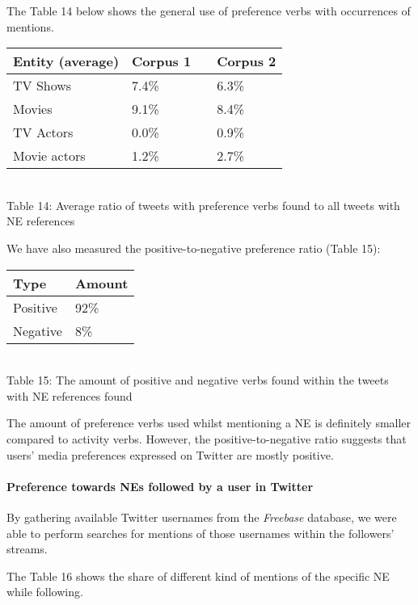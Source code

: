 The Table 14 below shows the general use of preference verbs with occurrences of
mentions.

\begin{center}
  \begin{tabular}{ | p{4cm} | p{2cm} | p{1cm}| p{2cm} | } \hline
    Entity (average) & Corpus 1 & & Corpus 2 \\ \hline
    TV Shows & 7.4\% & & 6.3\% \\ \hline
    Movies & 9.1\% & & 8.4\% \\ \hline
    TV Actors & 0.0\% & & 0.9\% \\ \hline
    Movie actors & 1.2\% & & 2.7\% \\ \hline
  \end{tabular} \\
  Table 14: Average ratio of tweets with preference verbs found to all tweets with NE references \\
\end{center}

We have also measured the positive-to-negative preference ratio (Table 15):

\begin{center}
  \begin{tabular}{ | p{3cm}| p{2cm} | } \hline
    Type & Amount \\ \hline
    Positive & 92\% \\ \hline
    Negative & 8\% \\ \hline
  \end{tabular} \\
  Table 15: The amount of positive and negative verbs found within the tweets with NE references found \\
\end{center}

The amount of preference verbs used whilst mentioning a NE is definitely
smaller compared to activity verbs. However, the positive-to-negative ratio suggests that users'
media preferences expressed on Twitter are mostly positive.

\paragraph{Preference towards NEs followed by a user in Twitter}
By gathering available Twitter usernames from the \textit{Freebase} database,
we were able to perform searches for mentions of those usernames within the followers' streams.

The Table 16 shows the share of different kind of mentions of the specific NE while following.

